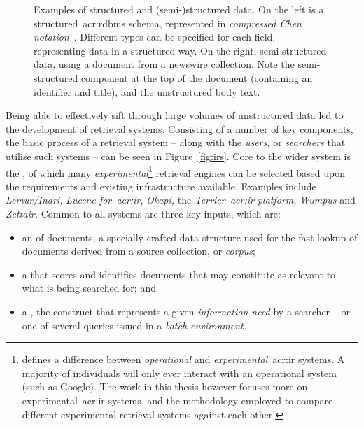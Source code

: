 \begin{figure}[t!]
    \centering
    \caption[Structured and (semi-)structured data]{Examples of structured and (semi-)structured data. On the left is a structured~\gls{acr:rdbms} schema, represented in \emph{compressed Chen notation}~\citep{chen1976notation}. Different types can be specified for each field, representing data in a structured way. On the right, semi-structured data, using a document from a newswire collection. Note the semi-structured component at the top of the document (containing an identifier and title), and the unstructured body text.}
    \label{fig:structured_data}
\end{figure}

Being able to effectively sift through large volumes of unstructured data led to the development of retrieval systems. Consisting of a number of key components, the basic process of a retrieval system -- along with the \emph{users,} or \emph{searchers} that utilise such systems -- can be seen in Figure~\ref{fig:irs}. Core to the wider system is the , of which many \emph{experimental}\footnote{\cite{rijsbergen1979ir} defines a difference between \emph{operational} and \emph{experimental}~\gls{acr:ir} systems. A majority of individuals will only ever interact with an operational system (such as Google). The work in this thesis however focuses more on experimental~\gls{acr:ir} systems, and the methodology employed to compare different experimental retrieval systems against each other.} retrieval engines can be selected based upon the requirements and existing infrastructure available. Examples include \emph{Lemur/Indri,} \emph{Lucene for~\gls{acr:ir}}, \emph{Okapi,} the \emph{Terrier~\gls{acr:ir} platform,} \emph{Wumpus} and \emph{Zettair.} Common to all systems are three key inputs, which are:

\begin{itemize}
    \item{an  of documents, a specially crafted data structure used for the fast lookup of documents derived from a source collection, or \emph{corpus};}
    \item{a  that scores and identifies documents that may constitute as relevant to what is being searched for; and}
    \item{a , the construct that represents a given \emph{information need} by a searcher -- or one of several queries issued in a \emph{batch environment.}}
\end{itemize}

